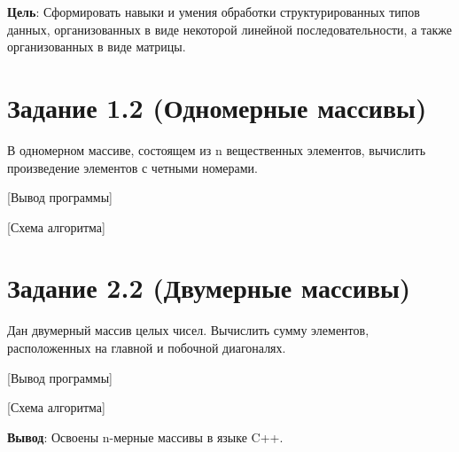 \documentclass[variant=labwork]{bsuir}
\begin{document}
\maketitle

\textbf{Цель}: Сформировать навыки и умения обработки структурированных типов
данных, организованных в виде некоторой линейной последовательности, а также
организованных в виде матрицы.

\section*{Задание 1.2 (Одномерные массивы)}

В одномерном массиве, состоящем из n вещественных элементов, вычислить
произведение элементов с четными номерами.


[Вывод программы]

[Схема алгоритма]

\section*{Задание 2.2 (Двумерные массивы)}

Дан двумерный массив целых чисел. Вычислить сумму элементов, расположенных на
главной и побочной диагоналях.


[Вывод программы]

[Схема алгоритма]

\textbf{Вывод}: Освоены n-мерные массивы в языке C++.
\end{document}
